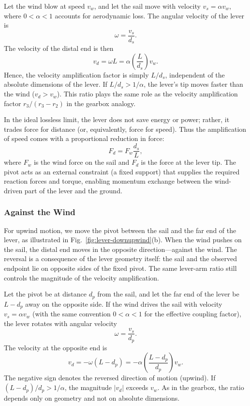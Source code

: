 \documentclass[a4paper]{article}
\begin{document}
Let the wind blow at speed $v_w$, and let the sail move with velocity $v_s = \alpha v_w$, where $0 < \alpha < 1$ accounts for aerodynamic loss. The angular velocity of the lever is
\begin{equation}
\omega = \frac{v_s}{d_s}.
\end{equation}
The velocity of the distal end is then
\begin{equation}
v_d = \omega L = \alpha \left(\frac{L}{d_s}\right) v_w.
\end{equation}
Hence, the velocity amplification factor is simply $L/d_s$, independent of the absolute dimensions of the lever. If $L/d_s > 1/\alpha$, the lever's tip moves faster than the wind ($v_d > v_w$).
This ratio plays the same role as the velocity amplification factor
$r_3/(r_3 - r_2)$ in the gearbox analogy.

In the ideal lossless limit, the lever does not save energy or power; rather,
it trades force for distance (or, equivalently, force for speed). Thus the
amplification of speed comes with a proportional reduction in force:
\begin{equation}
F_d = F_w \frac{d_s}{L},
\end{equation}
where $F_w$ is the wind force on the sail and $F_d$ is the force at the lever tip. The pivot acts as an external constraint (a fixed support) that supplies the required reaction forces and torque, enabling momentum exchange between the wind-driven part of the lever and the ground.

\subsubsection{Against the Wind}

For upwind motion, we move the pivot between the sail and the far end of the
lever, as illustrated in Fig.~\ref{fig:lever-downupwind}(b). When the wind
pushes on the sail, the distal end moves in the opposite direction---against
the wind. The reversal is a consequence of the lever geometry itself: the sail
and the observed endpoint lie on opposite sides of the fixed pivot. The same
lever-arm ratio still controls the magnitude of the velocity amplification.

Let the pivot be at distance $d_p$ from the sail, and let the far end of the lever be $L - d_p$ away on the opposite side. If the wind drives the sail with velocity $v_s = \alpha v_w$ (with the same convention $0 < \alpha < 1$ for the effective coupling factor), the lever rotates with angular velocity
\begin{equation}
\omega = \frac{v_s}{d_p}.
\end{equation}
The velocity at the opposite end is
\begin{equation}
v_d = -\omega (L - d_p) = -\alpha \left(\frac{L - d_p}{d_p}\right) v_w.
\end{equation}
The negative sign denotes the reversed direction of motion (upwind). If $(L - d_p)/d_p > 1/\alpha$, the magnitude $|v_d|$ exceeds $v_w$. As in the gearbox, the ratio depends only on geometry and not on absolute dimensions.
\end{document}
